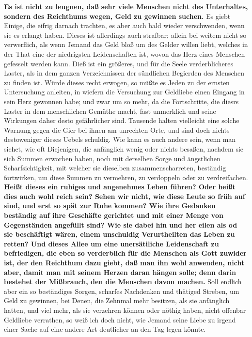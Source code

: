 \textbf{Es ist nicht zu leugnen, daß sehr viele Menschen nicht des Unterhaltes,
sondern
des Reichthums wegen, Geld zu gewinnen suchen.} Es giebt Einige, die eifrig
darnach trachten, es aber auch bald wieder verschwenden,
wenn sie es erlangt
haben. Dieses ist allerdings auch strafbar; allein bei weitem nicht so
verwerflich, als wenn Jemand das Geld bloß um des Gelder willen liebt, welches
in der That eine der niedrigsten Leidenschaften
ist, wovon das Herz eines
Menschen gefesselt werden kann. Dieß ist ein größeres, und für die Seele
verderblicheres Laster, als in dem ganzen Verzeichnissen der sündlichen
Begierden des Menschen zu finden ist. Würde dieses recht erwogen, so müßte es
Jeden zu der ernsten Untersuchung anleiten, in wiefern die Versuchung zur
Geldliebe einen Eingang in sein Herz gewonnen habe; und zwar um so mehr, da die
Fortschritte, die diesrs Laster in dem menschlichen Gemüthe macht, fast
unmerklich und seine Wirkungen daher desto gefährlicher sind. Tausende halten
vielleicht eine solche Warnung gegen die Gier bei ihnen am unrechten Orte, und
sind doch nichts destoweniger dieses Uebels schuldig. Wie kann es auch andere
sein, wenn man siehet, wie oft Diejenigen, die anfänglich wenig oder nichts
besaßen, nachdem sie sich Summen erworben haben, noch mit derselben Sorge und
ängstlichen Scharfsichtigkeit, mit welcher sie dieselben zusammenscharreten,
beständig fortwirken, um diese Summen zu vermehren, zu verdoppeln oder zu
verdreifachen. \textbf{Heißt dieses ein ruhiges und angenehmes Leben führen?
Oder heißt
dies auch wohl reich sein? Sehen wir nicht, wie diese Leute so früh auf sind,
und erst so spät zur Ruhe kommen? Wie ihre Gedanken beständig auf ihre Geschäfte
gerichtet und mit einer Menge von Gegenständen angefüllt sind? Wie sie dabei hin
und her eilen als od sie beschäftigt wären, einem unschuldig Verurtheilten das
Leben zu retten? Und dieses Allee um eine unersätiliche Leidenschaft zu
befriedigen, die eben so verderblich für die Menschen als Gott zuwider ist, der
den Reichthum dazu giebt, daß man ihn wohl anwenden, nicht aber, damit man mit
seinem Herzen daran hängen solle; denn darin bestehet der Mißbrauch, den die
Menschen davon machen.} Soll endlich aber ein so beständiges Sorgen, scharfes
Nachdenken und thätiged Streben, um Geld zu gewinnen, bei Denen, die Zehnmal
mehr besitzen, als sie anfänglich hatten, und viel mehr, als sie verzehren
können oder nöthig haben, nicht offenbar Geldliebe verrathen, so weiß ich doch
nicht, wie Jemand seine Liebe zu irgend einer Sache auf eine andere Art
deutlicher an den Tag legen könnte.


